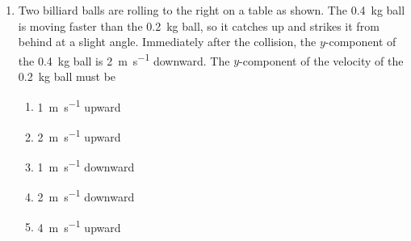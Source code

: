 \documentclass{../../../oss-apphys}
\begin{document}
\begin{multicols}{2}
\begin{enumerate}[leftmargin=18pt,resume]
  \item Two billiard balls are rolling to the right on a table as shown. The
    \SI{.4}{\kilo\gram} ball is moving faster than the \SI{.2}{\kilo\gram}
    ball, so it catches up and strikes it from behind at a slight angle.
    Immediately after the collision, the $y$-component of the
    \SI{.4}{\kilo\gram} ball is \SI{2}{\metre\per\second} downward.
    The $y$-component of the velocity of the \SI{.2}{\kilo\gram} ball must be
    \begin{center}
    \end{center}
    \begin{enumerate}[nosep,leftmargin=18pt,label=(\Alph*)]
    \item \SI{1}{\metre\per\second} upward
    \item \SI{2}{\metre\per\second} upward
    \item \SI{1}{\metre\per\second} downward
    \item \SI{2}{\metre\per\second} downward
    \item \SI{4}{\metre\per\second} upward
    \end{enumerate}

    


\end{enumerate}
\end{multicols}
\end{document}
